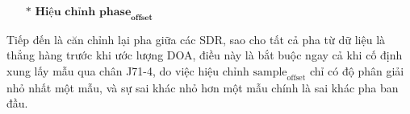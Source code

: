 

\begin{itemize}
	\item[$\ast$] \textbf{$\textbf{Hiệu chỉnh } \textbf{phase}_\textbf{offset}$}
\end{itemize} 


Tiếp đến là căn chỉnh lại pha giữa các SDR, sao cho tất cả pha từ dữ liệu là thẳng hàng trước khi ước lượng DOA, điều này là bắt buộc ngay cả khi cố định xung lấy mẫu qua chân J71-4, do việc hiệu chỉnh $\textrm{sample}_\textrm{offset}$ chỉ có độ phân giải nhỏ nhất một mẫu, và sự sai khác nhỏ hơn một mẫu chính là sai khác pha ban đầu. 


